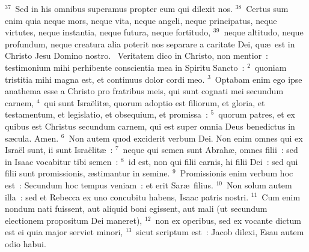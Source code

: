 ${}^{37}$~Sed in his omnibus superamus propter eum qui dilexit nos.
${}^{38}$~Certus sum enim quia neque mors, neque vita, neque angeli, neque principatus, neque virtutes, neque instantia, neque futura, neque fortitudo,
${}^{39}$~neque altitudo, neque profundum, neque creatura alia poterit nos separare a caritate Dei, qu\ae\ est in Christo Jesu Domino nostro.
~Veritatem dico in Christo, non mentior~: testimonium mihi perhibente conscientia mea in Spiritu Sancto~:
${}^{2}$~quoniam tristitia mihi magna est, et continuus dolor cordi meo.
${}^{3}$~Optabam enim ego ipse anathema esse a Christo pro fratribus meis, qui sunt cognati mei secundum carnem,
${}^{4}$~qui sunt Isra\"elit\ae , quorum adoptio est filiorum, et gloria, et testamentum, et legislatio, et obsequium, et promissa~:
${}^{5}$~quorum patres, et ex quibus est Christus secundum carnem, qui est super omnia Deus benedictus in s\ae cula. Amen.
${}^{6}$~Non autem quod exciderit verbum Dei. Non enim omnes qui ex Isra\"el sunt, ii sunt Isra\"elit\ae~:
${}^{7}$~neque qui semen sunt Abrah\ae , omnes filii~: sed in Isaac vocabitur tibi semen~:
${}^{8}$~id est, non qui filii carnis, hi filii Dei~: sed qui filii sunt promissionis, \ae stimantur in semine.
${}^{9}$~Promissionis enim verbum hoc est~: Secundum hoc tempus veniam~: et erit Sar\ae\ filius.
${}^{10}$~Non solum autem illa~: sed et Rebecca ex uno concubitu habens, Isaac patris nostri.
${}^{11}$~Cum enim nondum nati fuissent, aut aliquid boni egissent, aut mali (ut secundum electionem propositum Dei maneret),
${}^{12}$~non ex operibus, sed ex vocante dictum est ei quia major serviet minori,
${}^{13}$~sicut scriptum est~: Jacob dilexi, Esau autem odio habui.



